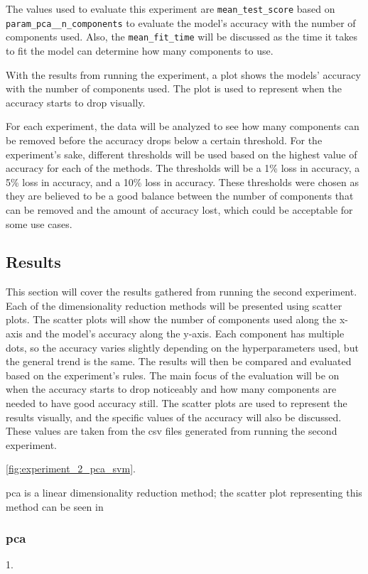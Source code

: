 The values used to evaluate this experiment are \texttt{mean\_test\_score} based on \texttt{param\_pca\_\_n\_components} to evaluate the model's accuracy with the number of components used. Also, the \texttt{mean\_fit\_time} will be discussed as the time it takes to fit the model can determine how many components to use.

With the results from running the experiment, a plot shows the models' accuracy with the number of components used. The plot is used to represent when the accuracy starts to drop visually.

For each experiment, the data will be analyzed to see how many components can be removed before the accuracy drops below a certain threshold. For the experiment's sake, different thresholds will be used based on the highest value of accuracy for each of the methods. The thresholds will be a 1\% loss in accuracy, a 5\% loss in accuracy, and a 10\% loss in accuracy. These thresholds were chosen as they are believed to be a good balance between the number of components that can be removed and the amount of accuracy lost, which could be acceptable for some use cases.


\subsection{Results}\label{subsec:experiment_2_results}
This section will cover the results gathered from running the second experiment. Each of the dimensionality reduction methods will be presented using scatter plots. The scatter plots will show the number of components used along the x-axis and the model's accuracy along the y-axis. Each component has multiple dots, so the accuracy varies slightly depending on the hyperparameters used, but the general trend is the same. The results will then be compared and evaluated based on the experiment's rules. The main focus of the evaluation will be on when the accuracy starts to drop noticeably and how many components are needed to have good accuracy still. The scatter plots are used to represent the results visually, and the specific values of the accuracy will also be discussed. These values are taken from the csv files generated from running the second experiment.

\autoref{fig:experiment_2_pca_svm}.


\gls{pca} is a linear dimensionality reduction method; the scatter plot representing this method can be seen in \subsubsection{\gls{pca}}\label{subsubsec:experiment_2_pca}1.

